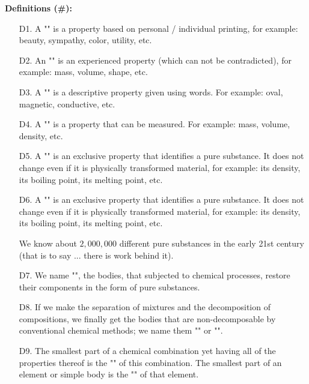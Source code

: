 	\textbf{Definitions (\#\mydef):}	
	\begin{enumerate}
		\item[D1.] A "" is a property based on personal / individual printing, for example: beauty, sympathy, color, utility, etc.
		
		\item[D2.] An "" is an experienced property (which can not be contradicted), for example: mass, volume, shape, etc.
		
		\item[D3.] A "" is a descriptive property given using words. For example: oval, magnetic, conductive, etc.
		
		\item[D4.] A "" is a property that can be measured. For example: mass, volume, density, etc.
		
		\item[D5.] A "" is an exclusive property that identifies a pure substance. It does not change even if it is physically transformed material, for example: its density, its boiling point, its melting point, etc.
		
		\item[D6.] A "" is an exclusive property that identifies a pure substance. It does not change even if it is physically transformed material, for example: its density, its boiling point, its melting point, etc.
		
		\begin{tcolorbox}[title=Remark,colframe=black,arc=10pt]
	We know about $2,000,000$ different pure substances in the early 21st century (that is to say ... there is work behind it).
		\end{tcolorbox}
		
		\item[D7.] We name "", the bodies, that subjected to chemical processes, restore their components in the form of pure substances.
		
		\item[D8.] If we make the separation of mixtures and the decomposition of compositions, we finally get the bodies that are non-decomposable by conventional chemical methods; we name them "" or "".
		
		\item[D9.] The smallest part of a chemical combination yet having all of the properties thereof is the "" of this combination. The smallest part of an element or simple body is the "" of that element.
	\end{enumerate}
